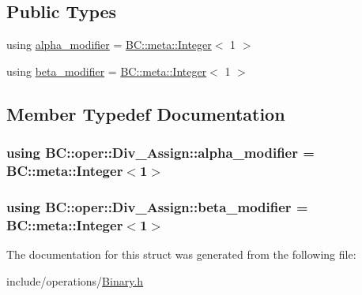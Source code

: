\subsection*{Public Types}
\begin{DoxyCompactItemize}
\item 
using \hyperlink{structBC_1_1oper_1_1Div__Assign_a18e29e45f33bd00b3249c88fc83ec67a}{alpha\+\_\+modifier} = \hyperlink{structBC_1_1meta_1_1Integer}{B\+C\+::meta\+::\+Integer}$<$ 1 $>$
\item 
using \hyperlink{structBC_1_1oper_1_1Div__Assign_a838665ce9388028b0bfd8358fe1cbfa5}{beta\+\_\+modifier} = \hyperlink{structBC_1_1meta_1_1Integer}{B\+C\+::meta\+::\+Integer}$<$ 1 $>$
\end{DoxyCompactItemize}


\subsection{Member Typedef Documentation}
\subsubsection[{\texorpdfstring{alpha\+\_\+modifier}{alpha_modifier}}]{\setlength{\rightskip}{0pt plus 5cm}using {\bf B\+C\+::oper\+::\+Div\+\_\+\+Assign\+::alpha\+\_\+modifier} =  {\bf B\+C\+::meta\+::\+Integer}$<$1$>$}\hypertarget{structBC_1_1oper_1_1Div__Assign_a18e29e45f33bd00b3249c88fc83ec67a}{}\label{structBC_1_1oper_1_1Div__Assign_a18e29e45f33bd00b3249c88fc83ec67a}
\subsubsection[{\texorpdfstring{beta\+\_\+modifier}{beta_modifier}}]{\setlength{\rightskip}{0pt plus 5cm}using {\bf B\+C\+::oper\+::\+Div\+\_\+\+Assign\+::beta\+\_\+modifier} =  {\bf B\+C\+::meta\+::\+Integer}$<$1$>$}\hypertarget{structBC_1_1oper_1_1Div__Assign_a838665ce9388028b0bfd8358fe1cbfa5}{}\label{structBC_1_1oper_1_1Div__Assign_a838665ce9388028b0bfd8358fe1cbfa5}


The documentation for this struct was generated from the following file\+:\begin{DoxyCompactItemize}
\item 
include/operations/\hyperlink{Binary_8h}{Binary.\+h}\end{DoxyCompactItemize}
